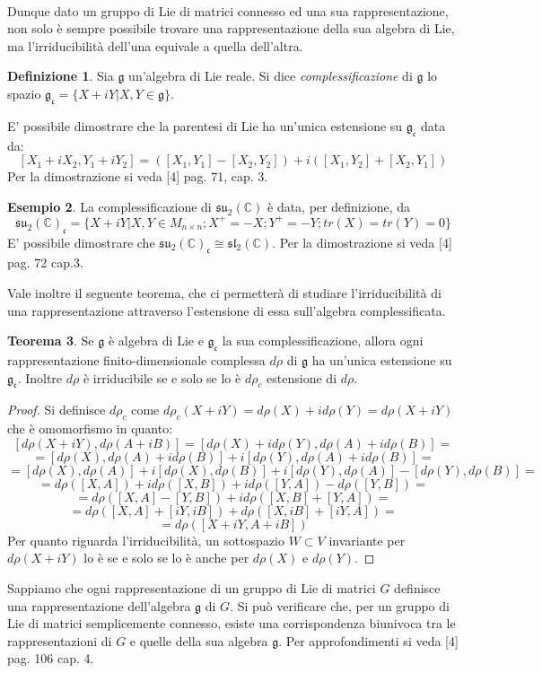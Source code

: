 \documentclass[12pt,a4paper]{report}
\theoremstyle{definition}
\newtheorem{Def}{Definizione}[chapter]
\theoremstyle{Theorem}
\newtheorem{Theo}[Def]{Teorema}
\theoremstyle{definition}
\newtheorem{Ex}[Def]{Esempio}
\theoremstyle{definition}
\theoremstyle{definition}
\begin{document}
\\
Dunque dato un gruppo di Lie di matrici connesso ed una sua rappresentazione, non solo è sempre possibile trovare una rappresentazione della sua algebra di Lie, ma l'irriducibilità dell'una equivale a quella dell'altra.
\begin{Def}
	Sia $\mathfrak{g}$ un'algebra di Lie reale. Si dice \textit{complessificazione} di $\mathfrak{g}$ lo spazio $\mathfrak{g_c}=\{X+iY|X,Y\in\mathfrak{g}\}$.
\end{Def}
E' possibile dimostrare che la parentesi di Lie ha un'unica estensione su $\mathfrak{g_c}$ data da:
$$[X_1+iX_2,Y_1+iY_2]=([X_1,Y_1]-[X_2,Y_2])+i([X_1,Y_2]+[X_2,Y_1])$$
Per la dimostrazione si veda [4] pag. 71, cap. 3.\\
\begin{Ex}
La complessificazione di $\mathfrak{su_2(\mathbb{C})}$ è data, per definizione, da $$\mathfrak{su_2(\mathbb{C})_c}=\{X+iY|X,Y\in M_{n\times n} ;X^{+}=-X;Y^{+}=-Y;tr(X)=tr(Y)=0\}$$
E' possibile dimostrare che $\mathfrak{su_2(\mathbb{C})_c}\cong \mathfrak{sl_2(\mathbb{C})}$. Per la dimostrazione si veda [4] pag. 72 cap.3.
\end{Ex}
Vale inoltre il seguente teorema, che ci permetterà di studiare l'irriducibilità di una rappresentazione attraverso l'estensione di essa sull'algebra complessificata.
\begin{Theo}
	Se $\mathfrak{g}$ è algebra di Lie e $\mathfrak{g_c}$ la sua complessificazione, allora ogni rappresentazione finito-dimensionale complessa  $d\rho$ di $\mathfrak{g}$ ha un'unica estensione su $\mathfrak{g_c}$. Inoltre $d\rho$ è irriducibile se e solo se lo è $d\rho_c$ estensione di $d\rho$.
\end{Theo}
\begin{proof}
	Si definisce $d\rho_c$ come $d\rho_c(X+iY)=d\rho(X)+id\rho(Y)=d\rho(X+iY)$ che è omomorfismo in quanto: 
	$$[d\rho(X+iY),d\rho(A+iB)]=[d\rho(X)+id\rho(Y),d\rho(A)+id\rho(B)]=$$$$=[d\rho(X),d\rho(A)+id\rho(B)]+i[d\rho(Y),d\rho(A)+id\rho(B)]=$$
	$$=[d\rho(X),d\rho(A)]+i[d\rho(X),d\rho(B)]+i[d\rho(Y),d\rho(A)]-[d\rho(Y),d\rho(B)]=$$
	$$=d\rho([X,A])+id\rho([X,B])+id\rho([Y,A])-d\rho([Y,B])=$$
	$$=d\rho([X,A]-[Y,B])+id\rho([X,B]+[Y,A])=$$
	$$=d\rho([X,A]+[iY,iB])+d\rho([X,iB]+[iY,A])=$$
	$$=d\rho([X+iY,A+iB])$$
	Per quanto riguarda l'irriducibilità, un sottospazio $W\subset V$ invariante per $d\rho(X+iY)$ lo è se e solo se lo è anche per $d\rho(X)$ e $d\rho(Y)$.
\end{proof}
Sappiamo che ogni rappresentazione di un gruppo di Lie di matrici $G$ definisce una rappresentazione dell'algebra $\mathfrak{g}$ di $G$.
Si può verificare che, per un gruppo di Lie di matrici semplicemente connesso, esiste una corrispondenza biunivoca tra le rappresentazioni di $G$ e quelle della sua algebra $\mathfrak{g}$. Per approfondimenti si veda [4] pag. 106 cap. 4.
\end{document}
